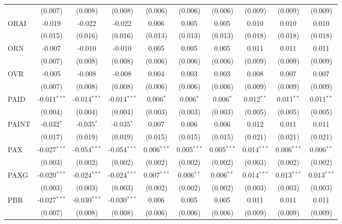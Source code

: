 \begin{table}[!htbp]
\begin{tabular}{@{\extracolsep{5pt}}lccccccccc}
  & (0.007) & (0.008) & (0.008) & (0.006) & (0.006) & (0.006) & (0.009) & (0.009) & (0.009) \\
 ORAI & -0.019$^{}$ & -0.022$^{}$ & -0.022$^{}$ & 0.006$^{}$ & 0.005$^{}$ & 0.005$^{}$ & 0.010$^{}$ & 0.010$^{}$ & 0.010$^{}$ \\
  & (0.015) & (0.016) & (0.016) & (0.013) & (0.013) & (0.013) & (0.018) & (0.018) & (0.018) \\
 ORN & -0.007$^{}$ & -0.010$^{}$ & -0.010$^{}$ & 0.005$^{}$ & 0.005$^{}$ & 0.005$^{}$ & 0.011$^{}$ & 0.011$^{}$ & 0.011$^{}$ \\
  & (0.007) & (0.008) & (0.008) & (0.006) & (0.006) & (0.006) & (0.009) & (0.009) & (0.009) \\
 OVR & -0.005$^{}$ & -0.008$^{}$ & -0.008$^{}$ & 0.004$^{}$ & 0.003$^{}$ & 0.003$^{}$ & 0.008$^{}$ & 0.007$^{}$ & 0.007$^{}$ \\
  & (0.007) & (0.008) & (0.008) & (0.006) & (0.006) & (0.006) & (0.009) & (0.009) & (0.009) \\
 PAID & -0.011$^{***}$ & -0.014$^{***}$ & -0.014$^{***}$ & 0.006$^{*}$ & 0.006$^{*}$ & 0.006$^{*}$ & 0.012$^{**}$ & 0.011$^{**}$ & 0.011$^{**}$ \\
  & (0.004) & (0.004) & (0.004) & (0.003) & (0.003) & (0.003) & (0.005) & (0.005) & (0.005) \\
 PAINT & -0.032$^{*}$ & -0.035$^{*}$ & -0.035$^{*}$ & 0.007$^{}$ & 0.006$^{}$ & 0.006$^{}$ & 0.012$^{}$ & 0.011$^{}$ & 0.011$^{}$ \\
  & (0.017) & (0.019) & (0.019) & (0.015) & (0.015) & (0.015) & (0.021) & (0.021) & (0.021) \\
 PAX & -0.027$^{***}$ & -0.054$^{***}$ & -0.054$^{***}$ & 0.006$^{***}$ & 0.005$^{***}$ & 0.005$^{***}$ & 0.014$^{***}$ & 0.006$^{***}$ & 0.006$^{**}$ \\
  & (0.003) & (0.002) & (0.002) & (0.002) & (0.002) & (0.002) & (0.003) & (0.002) & (0.002) \\
 PAXG & -0.020$^{***}$ & -0.024$^{***}$ & -0.024$^{***}$ & 0.007$^{***}$ & 0.006$^{**}$ & 0.006$^{**}$ & 0.014$^{***}$ & 0.013$^{***}$ & 0.013$^{***}$ \\
  & (0.003) & (0.003) & (0.003) & (0.002) & (0.002) & (0.002) & (0.003) & (0.003) & (0.003) \\
 PBR & -0.027$^{***}$ & -0.030$^{***}$ & -0.030$^{***}$ & 0.006$^{}$ & 0.005$^{}$ & 0.005$^{}$ & 0.011$^{}$ & 0.011$^{}$ & 0.011$^{}$ \\
  & (0.007) & (0.008) & (0.008) & (0.006) & (0.006) & (0.006) & (0.009) & (0.009) & (0.009) \\

\end{tabular}
\end{table}
